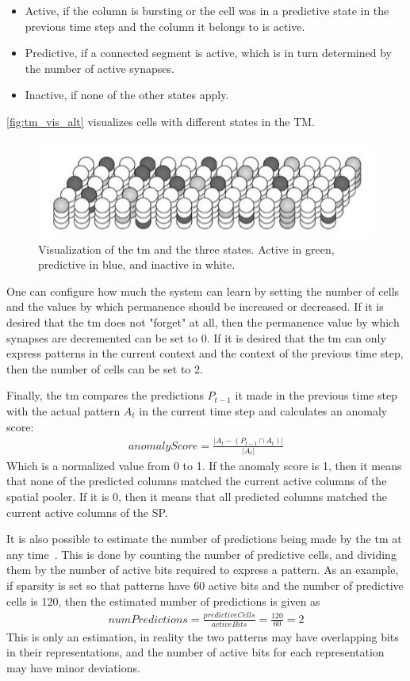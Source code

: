\begin{itemize}
    \item Active, if the column is bursting or the cell was in a predictive state in the previous time step and the column it belongs to is active.
    \item Predictive, if a connected segment is active, which is in turn determined by the number of active synapses.
    \item Inactive, if none of the other states apply.
\end{itemize}
\autoref{fig:tm_vis_alt} visualizes cells with different states in the TM.
\begin{figure}[htb]
    \centering
    \includegraphics[width=0.6\linewidth]{resources/related_works/tm_vis_alt}
    \caption[Visualization of Cell States]{Visualization of the \gls*{tm} and the three states. Active in green, predictive in blue, and inactive in white.}
    \label{fig:tm_vis_alt}
\end{figure}
\par
One can configure how much the system can learn by setting the number of cells and the values by which permanence should be increased or decreased. If it is desired that the \gls*{tm} does not "forget" at all, then the permanence value by which synapses are decremented can be set to 0. If it is desired that the \gls*{tm} can only express patterns in the current context and the context of the previous time step, then the number of cells can be set to 2.
\par
Finally, the \gls*{tm} compares the predictions $P_{t-1}$ it made in the previous time step with the actual pattern $A_t$ in the current time step and calculates an anomaly score:
\begin{align*}
    anomalyScore=\frac{|A_t-(P_{t-1}\cap A_t)|}{|A_t|}
\end{align*}
Which is a normalized value from 0 to 1. If the anomaly score is 1, then it means that none of the predicted columns matched the current active columns of the spatial pooler. If it is 0, then it means that all predicted columns matched the current active columns of the SP.\par
It is also possible to estimate the number of predictions being made by the \gls*{tm} at any time~\cite{htm_predictions_count}. This is done by counting the number of predictive cells, and dividing them by the number of active bits required to express a pattern. As an example, if sparsity is set so that patterns have 60 active bits and the number of predictive cells is 120, then the estimated number of predictions is given as
\begin{align*}
    numPredictions=\frac{predictiveCells}{activeBits}=\frac{120}{60}=2
\end{align*}
This is only an estimation, in reality the two patterns may have overlapping bits in their representations, and the number of active bits for each representation may have minor deviations.

